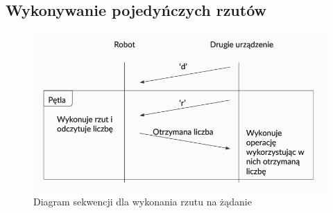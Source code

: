 \subsection{Wykonywanie pojedyńczych rzutów}

\begin{figure}[H]
    \centering
    \includegraphics[width=0.5\linewidth]{chapters/05-Przetwarzanie Wyniku/figures/InterfaceB}
    \caption{Diagram sekwencji dla wykonania rzutu na żądanie}
    \label{fig:interface_b}
\end{figure}

